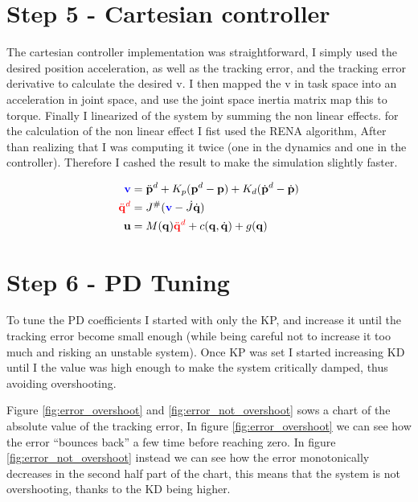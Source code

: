 \documentclass[12pt,a4paper]{article}
\begin{document}
\section{Step 5 - Cartesian controller}

The cartesian controller implementation was straightforward, I simply used the 
desired position acceleration, as well as the tracking error, and the tracking error derivative
to calculate the desired v. I then mapped the v in task space into an acceleration in 
joint space, and use the joint space inertia matrix map this to torque.
Finally I linearized of the system by summing the non linear effects.
for the calculation of the non linear effect I fist used the RENA algorithm,
After than realizing that I was computing it twice (one in the dynamics and one in the controller).
Therefore I cashed the result to make the simulation slightly faster.

\begin{align*}
\textcolor{blue}{\mathbf{v}} &= \ddot{\mathbf{p}}^d + K_p (\mathbf{p}^d - \mathbf{p}) + K_d (\dot{\mathbf{p}}^d - \dot{\mathbf{p}}) \\
\textcolor{red}{\ddot{\mathbf{q}}^d} &= J^\# (\textcolor{blue}{\mathbf{v}} - \dot{J} \dot{\mathbf{q}}) \\
\mathbf{u} &= M(\mathbf{q}) \textcolor{red}{\ddot{\mathbf{q}}^d} + c(\mathbf{q}, \dot{\mathbf{q}}) + g(\mathbf{q})
\end{align*}

\section{Step 6 - PD Tuning}

To tune the PD coefficients I started with only the KP, and increase it until the tracking
error become small enough (while being careful not to increase it too much and risking an unstable system).
Once KP was set I started increasing KD until I the value was high enough to make the system critically damped, thus 
avoiding overshooting.

Figure \ref{fig:error_overshoot} and \ref{fig:error_not_overshoot} sows a chart of the absolute value of the
tracking error, In figure \ref{fig:error_overshoot} we can see how the error ``bounces back'' a few time
before reaching zero. In figure \ref{fig:error_not_overshoot} instead we can see how the error monotonically
decreases in the second half part of the chart, this means that the system is not overshooting, thanks 
to the KD being higher.
\end{document}
